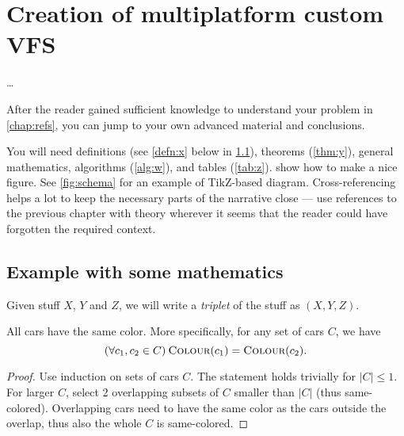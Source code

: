 \chapter{Creation of multiplatform custom VFS}
\label{chap:math}

\ldots

After the reader gained sufficient knowledge to understand your problem in \cref{chap:refs}, you can jump to your own advanced material and conclusions.

You will need definitions (see \cref{defn:x} below in \cref{sec:demo}), theorems (\cref{thm:y}), general mathematics, algorithms (\cref{alg:w}), and tables (\cref{tab:z}).  show how to make a nice figure. See \cref{fig:schema} for an example of TikZ-based diagram. Cross-referencing helps a lot to keep the necessary parts of the narrative close --- use references to the previous chapter with theory wherever it seems that the reader could have forgotten the required context.

\section{Example with some mathematics}
\label{sec:demo}

\begin{defn}[Triplet]\label{defn:x}
Given stuff $X$, $Y$ and $Z$, we will write a \emph{triplet} of the stuff as $(X,Y,Z)$.
\end{defn}

\newcommand{\Col}{\textsc{Colour}}

\begin{thm}\label{thm:y}
All cars have the same color. More specifically, for any set of cars $C$, we have
$$(\forall c_1, c_2 \in C)\:\Col(c_1) = \Col(c_2).$$
\end{thm}

\begin{proof}
Use induction on sets of cars $C$. The statement holds trivially for $|C|\leq1$. For larger $C$, select 2 overlapping subsets of $C$ smaller than $|C|$ (thus same-colored). Overlapping cars need to have the same color as the cars outside the overlap, thus also the whole $C$ is same-colored.
\end{proof}

